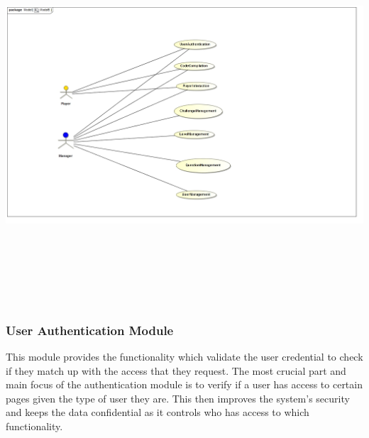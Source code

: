 \documentclass[english]{article}
\begin{document}
		\includegraphics[width=14cm,height=14cm,keepaspectratio]{ArcaneArcade.jpg}
		
		\newpage
		\subsubsection{User Authentication Module}
		This module provides the functionality which validate the user credential to check if they match up with the access that they request. The most crucial part and main focus of the authentication module is to verify if a user has access to certain pages given the type of user they are. This then improves the system's security and keeps the data confidential as it controls who has access to which functionality. \newline \newline
		
\end{document}
